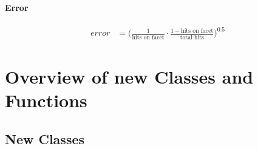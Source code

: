 
\subsubsection*{Error}
\begin{equation}
	\label{eq:error}
	\begin{split}
		error&=\Big( \frac{1}{\text{hits on facet}} \cdot \frac{1-\text{hits on facet}}{\text{total hits}} \Big)^{0.5}
	\end{split}
\end{equation}

\chapter{Overview of new Classes and Functions}
\section{New Classes}

